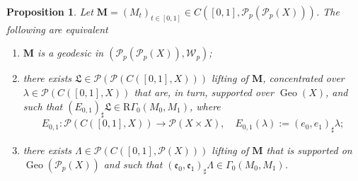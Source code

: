\documentclass[10pt,leqno]{amsart}
\numberwithin{equation}{section}
\newtheorem{prop}[teorema]{Proposition}
\newcommand{\PP}{\mathcal{P}}
\begin{document}
\begin{prop}\label{prop: char geo}
    Let $\boldsymbol{M} = (M_t)_{t\in[0,1]} \in C([0,1],\PP_p(\PP_p(X)))$. The following are equivalent
    \begin{enumerate}
        \item $\boldsymbol{M}$ is a geodesic in $(\PP_p(\PP_p(X)),\mathcal{W}_p)$;
        \item there exists $\mathfrak{L}\in \PP(\PP(C([0,1],X)))$ lifting of $\boldsymbol{M}$, concentrated over $\lambda \in \PP(C([0,1],X))$ that are, in turn, supported over $\operatorname{Geo}(X)$, and such that $(E_{0,1})_\sharp \mathfrak{L} \in \mathrm{R}\Gamma_0(M_0,M_1)$, where 
        \begin{equation}
            E_{0,1}: \PP(C([0,1],X)) \to \PP(X \times X), \quad E_{0,1}(\lambda) := (e_0,e_1)_\sharp \lambda;
        \end{equation}
        \item there exists $\Lambda \in \PP(C([0,1],\PP(X)))$ lifting of $\boldsymbol{M}$ that is supported on $\operatorname{Geo}(\PP_p(X))$ and such that $(\mathfrak{e}_0,\mathfrak{e}_1)_\sharp \Lambda \in \Gamma_0(M_0,M_1)$.
    \end{enumerate}
\end{prop}
\end{document}
